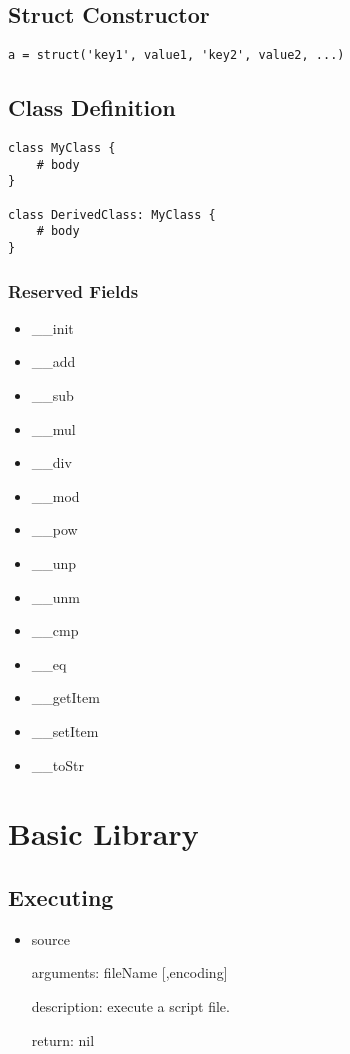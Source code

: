 \documentclass[]{article}
\begin{document}
\subsection{Struct Constructor}
\begin{lstlisting}
a = struct('key1', value1, 'key2', value2, ...)
\end{lstlisting}
\subsection{Class Definition}
\begin{lstlisting}
class MyClass {
	# body
}

class DerivedClass: MyClass {
	# body
}
\end{lstlisting}

\subsubsection{Reserved Fields}
\begin{itemize}
	\item \_\_init
	\item \_\_add
	\item \_\_sub
	\item \_\_mul
	\item \_\_div
	\item \_\_mod
	\item \_\_pow
	\item \_\_unp
	\item \_\_unm
	\item \_\_cmp
	\item \_\_eq
	\item \_\_getItem
	\item \_\_setItem
	\item \_\_toStr
\end{itemize}


\section{Basic Library}
\subsection{Executing}
\begin{itemize}
	\item source
	
	arguments: fileName [,encoding]
	
	description: execute a script file.
	
	return: nil
\end{itemize}
\end{document}
